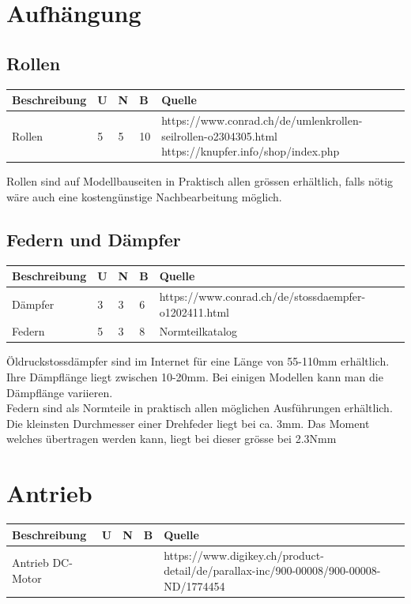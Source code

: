 \documentclass[a4paper]{report}
\begin{document}
\section{Aufhängung}
	\subsection{Rollen}
	\begin{tabular}{|p{}|p{}|p{}|p{}|p{}|}
		\hline
		\textbf{Beschreibung} & \textbf{U} & \textbf{N} & \textbf{B} & \textbf{Quelle} \\
		\hline
		Rollen &5 &5 &10 & https://www.conrad.ch/de/umlenkrollen-seilrollen-o2304305.html
		\newline https://knupfer.info/shop/index.php \\
		\hline
	\end{tabular}


		Rollen sind auf Modellbauseiten in Praktisch allen grössen erhältlich, falls nötig wäre auch eine kostengünstige Nachbearbeitung möglich.
	\subsection{Federn und Dämpfer}
		\begin{tabular}{|p{}|p{}|p{}|p{}|p{}|}
		\hline
		\textbf{Beschreibung} & \textbf{U} & \textbf{N} & \textbf{B} & \textbf{Quelle} \\
		\hline
		Dämpfer &3 &3 &6 & https://www.conrad.ch/de/stossdaempfer-o1202411.html \\
		\hline
		Federn &5 &3 &8 & Normteilkatalog\\
		\hline
	\end{tabular}


		Öldruckstossdämpfer sind im Internet für eine Länge von 55-110mm erhältlich. Ihre Dämpflänge liegt zwischen 10-20mm. Bei einigen Modellen kann man die Dämpflänge variieren. \\
		Federn sind als Normteile in praktisch allen möglichen Ausführungen erhältlich. Die kleinsten Durchmesser einer Drehfeder liegt bei ca. 3mm. Das Moment welches übertragen werden kann, liegt bei dieser grösse bei 2.3Nmm

\section{Antrieb}
\begin{tabular}{|p{}|p{}|p{}|p{}|p{}|}
	\hline
	\textbf{Beschreibung} & \textbf{U} & \textbf{N} & \textbf{B} & \textbf{Quelle} \\
	\hline
	Antrieb DC-Motor & & & & https://www.digikey.ch/product-detail/de/parallax-inc/900-00008/900-00008-ND/1774454 \\
	\hline
\end{tabular}
\end{document}
